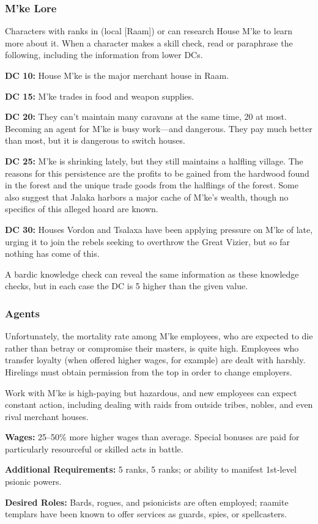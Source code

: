 \subsubsection{M'ke Lore}
Characters with ranks in  (local [Raam]) or  can research House M'ke to learn more about it. When a character makes a skill check, read or paraphrase the following, including the information from lower DCs.

\textbf{DC 10:} House M'ke is the major merchant house in Raam.

\textbf{DC 15:} M'ke trades in food and weapon supplies.

\textbf{DC 20:} They can't maintain many caravans at the same time, 20 at most. Becoming an agent for M'ke is busy work---and dangerous. They pay much better than most, but it is dangerous to switch houses.

\textbf{DC 25:} M'ke is shrinking lately, but they still maintains a halfling village. The reasons for this persistence are the profits to be gained from the hardwood found in the forest and the unique trade goods from the halflings of the forest. Some also suggest that Jalaka harbors a major cache of M'ke's wealth, though no specifics of this alleged hoard are known.

\textbf{DC 30:} Houses Vordon and Tsalaxa have been applying pressure on M’ke of late, urging it to join the rebels seeking to overthrow the Great Vizier, but so far nothing has come of this.

A bardic knowledge check can reveal the same information as these knowledge checks, but in each case the DC is 5 higher than the given value.

\subsubsection{Agents}
Unfortunately, the mortality rate among M'ke employees, who are expected to die rather than betray or compromise their masters, is quite high. Employees who transfer loyalty (when offered higher wages, for example) are dealt with harshly. Hirelings must obtain permission from the top in order to change employers.

Work with M'ke is high-paying but hazardous, and new employees can expect constant action, including dealing with raids from outside tribes, nobles, and even rival merchant houses.

\textbf{Wages:} 25--50\% more higher wages than average. Special bonuses are paid for particularly resourceful or skilled acts in battle.

\textbf{Additional Requirements:}  5 ranks,  5 ranks; or ability to manifest 1st-level psionic powers.

\textbf{Desired Roles:} Bards, rogues, and psionicists are often employed; raamite templars have been known to offer services as guards, spies, or spellcasters.